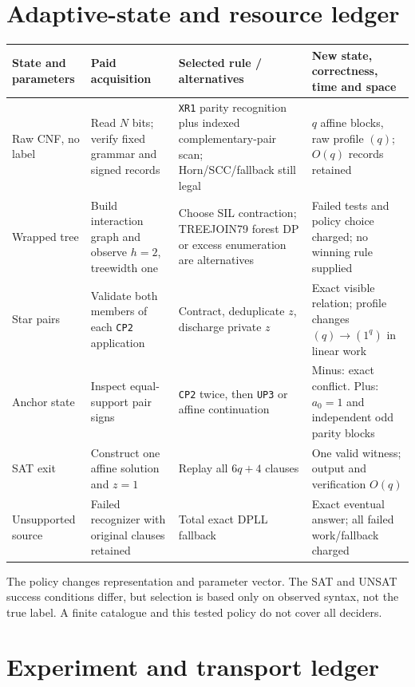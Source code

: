 \documentclass[11pt]{article}
\begin{document}
\section{Adaptive-state and resource ledger}
\begin{center}\small
\begin{tabular}{p{.17\linewidth}p{.23\linewidth}p{.25\linewidth}p{.25\linewidth}}
\toprule
State and parameters & Paid acquisition & Selected rule / alternatives & New state, correctness, time and space\\\midrule
Raw CNF, no label & Read $N$ bits; verify fixed grammar and signed records & \texttt{XR1} parity recognition plus indexed complementary-pair scan; Horn/SCC/fallback still legal & $q$ affine blocks, raw profile $(q)$; $O(q)$ records retained\\
Wrapped tree & Build interaction graph and observe $h=2$, treewidth one & Choose SIL contraction; TREEJOIN79 forest DP or excess enumeration are alternatives & Failed tests and policy choice charged; no winning rule supplied\\
Star pairs & Validate both members of each \texttt{CP2} application & Contract, deduplicate $z$, discharge private $z$ & Exact visible relation; profile changes $(q)\to(1^q)$ in linear work\\
Anchor state & Inspect equal-support pair signs & \texttt{CP2} twice, then \texttt{UP3} or affine continuation & Minus: exact conflict. Plus: $a_0=1$ and independent odd parity blocks\\
SAT exit & Construct one affine solution and $z=1$ & Replay all $6q+4$ clauses & One valid witness; output and verification $O(q)$\\
Unsupported source & Failed recognizer with original clauses retained & Total exact DPLL fallback & Exact eventual answer; all failed work/fallback charged\\
\bottomrule
\end{tabular}
\end{center}
The policy changes representation and parameter vector.  The SAT and UNSAT
success conditions differ, but selection is based only on observed syntax,
not the true label.  A finite catalogue and this tested policy do not cover
all deciders.

\section{Experiment and transport ledger}
\end{document}
